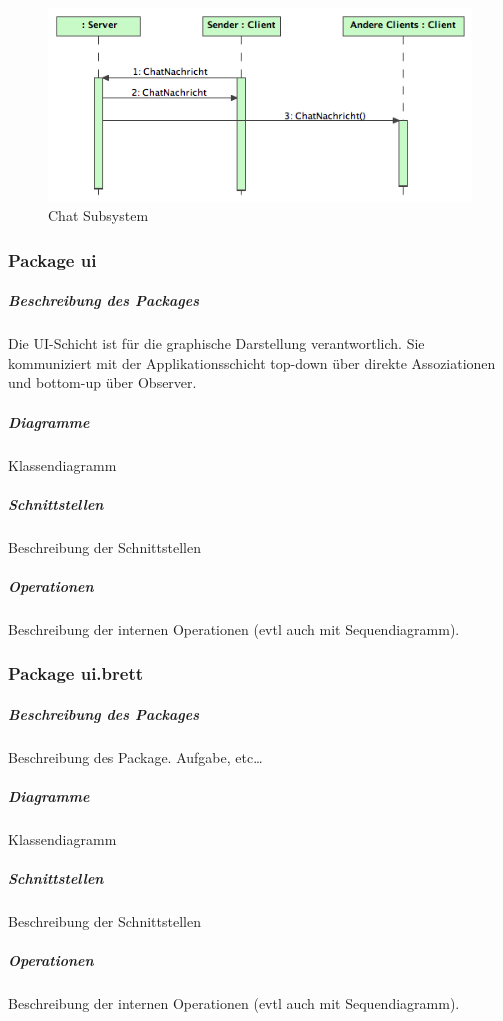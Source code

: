\documentclass[a4paper,12pt,halfparskip,DIV12]{scrartcl}
\begin{document}
\begin{figure}
	\centering
	\includegraphics[width=\textwidth]{dienste_chat}
	\caption{Chat Subsystem}
	\label{fig:dienste_chat}
\end{figure}

\clearpage
\subsubsection{Package ui} %
\label{ssub:package_ui}
\subparagraph{Beschreibung des Packages} %
\label{ssub:beschreibung_des_packages}
Die UI-Schicht ist für die graphische Darstellung verantwortlich. Sie kommuniziert mit der Applikationsschicht top-down über direkte Assoziationen und bottom-up über Observer.
\subparagraph{Diagramme} %
\label{ssub:diagramme}
Klassendiagramm
\subparagraph{Schnittstellen} %
\label{ssub:schnittstellen}
Beschreibung der Schnittstellen
\subparagraph{Operationen} %
\label{ssub:operationen}
Beschreibung der internen Operationen (evtl auch mit Sequendiagramm).

\clearpage
\subsubsection{Package ui.brett} %
\label{ssub:package_ui_brett}
\subparagraph{Beschreibung des Packages} %
\label{ssub:beschreibung_des_packages}
Beschreibung des Package. Aufgabe, etc…
\subparagraph{Diagramme} %
\label{ssub:diagramme}
Klassendiagramm
\subparagraph{Schnittstellen} %
\label{ssub:schnittstellen}
Beschreibung der Schnittstellen
\subparagraph{Operationen} %
\label{ssub:operationen}
Beschreibung der internen Operationen (evtl auch mit Sequendiagramm).
\end{document}
